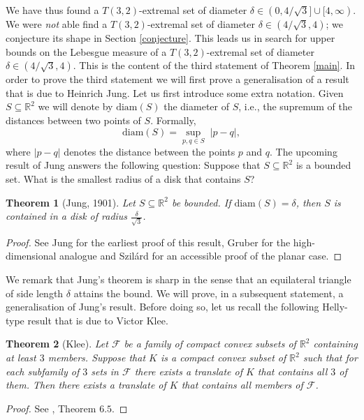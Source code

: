 \documentclass[12pt]{article}
\newtheorem{thm}{Theorem}[section]
\begin{document}
We have thus found a $T(3,2)$-extremal set of diameter $\delta \in (0,4/\sqrt{3}]\cup [4,\infty)$. 
We were \emph{not} able find a $T(3,2)$-extremal set of diameter $\delta\in (4/\sqrt{3},4)$; we conjecture 
its shape in Section \ref{conjecture}. This leads us in search for upper bounds on 
the Lebesgue measure of a $T(3,2)$-extremal set of diameter $\delta\in (4/\sqrt{3},4)$. 
This is the content of the third statement of Theorem \ref{main}.
In order to prove the third statement we will first prove a generalisation of a result that is due to Heinrich Jung. 
Let us first introduce some extra notation. Given $S\subseteq \mathbb{R}^2$ we will denote by 
$\text{diam}(S)$ the 
diameter of $S$, i.e., the supremum of the distances between two points of $S$. Formally, 
\[ \text{diam}(S) = \sup_{p,q\in S} \; |p-q| , \] 
where $|p-q|$ denotes the distance between the points $p$ and $q$. 
The upcoming result of Jung answers the following question: Suppose that 
$S\subseteq \mathbb{R}^2$ is 
a bounded set. What is the smallest radius of a disk that contains $S$? 

\begin{thm}[Jung, 1901] Let $S\subseteq \mathbb{R}^2$ be bounded. If $\text{diam}(S) =\delta$,
then $S$ is contained in a disk of radius $\frac{\delta}{\sqrt{3}}$.
\end{thm}
\begin{proof} See Jung \cite{Jung} for the earliest proof of this result, Gruber \cite{Gruber} for the 
high-dimensional 
analogue and  Szil\'ard \cite{Szilard} for an accessible proof of the planar case.
\end{proof}

We remark that Jung's theorem is sharp in the sense that an equilateral triangle of side length $\delta$ 
attains the bound.
We will prove, in a subsequent statement, a generalisation of Jung's result. Before doing so, let us 
recall  the following Helly-type result that is due to Victor Klee.

\begin{thm}[Klee]
\label{Klee} Let $\mathcal{F}$ be a family of compact convex subsets of $\mathbb{R}^2$ containing at 
least $3$ members. Suppose that $K$ is a compact convex subset of $\mathbb{R}^2$ such that 
for each subfamily of $3$ sets in $\mathcal{F}$ there exists a translate of $K$ that contains all $3$ of them.
Then there exists a translate of $K$ that contains all members of $\mathcal{F}$.
\end{thm}
\begin{proof} See \cite{Lay}, Theorem $6.5$.
\end{proof}
\end{document}

